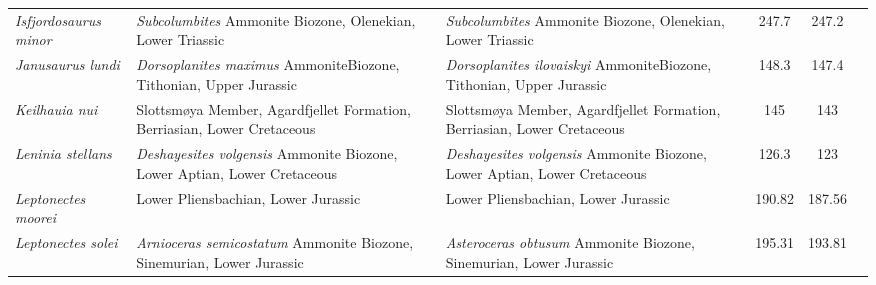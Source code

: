 \begin{longtabu}{>{\itshape}lXXSSl}
	Isfjordosaurus minor                                 & \emph{Subcolumbites} Ammonite Biozone, Olenekian, Lower Triassic                                                                   & \emph{Subcolumbites} Ammonite Biozone, Olenekian, Lower Triassic                                                                   & 247.7                    & 247.2                    & \cite{Wiman1910} \\                      
	Janusaurus lundi                                     & \emph{Dorsoplanites maximus} AmmoniteBiozone, Tithonian, Upper Jurassic                                                            & \emph{Dorsoplanites ilovaiskyi} AmmoniteBiozone, Tithonian, Upper Jurassic                                                         & 148.3                    & 147.4                    & \cite{Roberts2014} \\                    
	Keilhauia nui                                        & Slottsmøya Member, Agardfjellet Formation, Berriasian, Lower Cretaceous                                                            & Slottsmøya Member, Agardfjellet Formation, Berriasian, Lower Cretaceous                                                            & 145                      & 143                      & \cite{Delsett2017} \\                    
	Leninia stellans                                     & \emph{Deshayesites volgensis} Ammonite Biozone, Lower Aptian, Lower Cretaceous                                                     & \emph{Deshayesites volgensis} Ammonite Biozone, Lower Aptian, Lower Cretaceous                                                     & 126.3                    & 123                      & \cite{Fischer2014} \\                    
	Leptonectes moorei                                   & Lower Pliensbachian, Lower Jurassic                                                                                                & Lower Pliensbachian, Lower Jurassic                                                                                                & 190.82                   & 187.56                   & \cite{McGowan1999a} \\                   
	Leptonectes solei                                    & \emph{Arnioceras semicostatum} Ammonite Biozone, Sinemurian, Lower Jurassic                                                        & \emph{Asteroceras obtusum} Ammonite Biozone, Sinemurian, Lower Jurassic                                                            & 195.31                   & 193.81                   & \cite{McGowan1993} \\                    

\end{longtabu}
